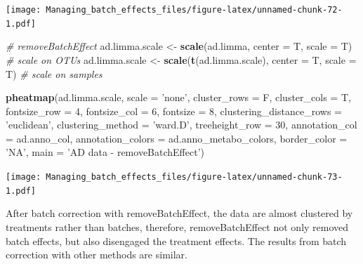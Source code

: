\documentclass[]{book}
\newenvironment{Shaded}{\begin{snugshade}}{\end{snugshade}}
\newcommand{\KeywordTok}[1]{\textcolor[rgb]{0.13,0.29,0.53}{\textbf{#1}}}
\newcommand{\DataTypeTok}[1]{\textcolor[rgb]{0.13,0.29,0.53}{#1}}
\newcommand{\DecValTok}[1]{\textcolor[rgb]{0.00,0.00,0.81}{#1}}
\newcommand{\StringTok}[1]{\textcolor[rgb]{0.31,0.60,0.02}{#1}}
\newcommand{\CommentTok}[1]{\textcolor[rgb]{0.56,0.35,0.01}{\textit{#1}}}
\newcommand{\NormalTok}[1]{#1}
\begin{document}
\texttt{[image: Managing\_batch\_effects\_files/figure-latex/unnamed-chunk-72-1.pdf]}

\begin{Shaded}
\begin{Highlighting}[]
\CommentTok{# removeBatchEffect}
\NormalTok{ad.limma.scale <-}\StringTok{ }\KeywordTok{scale}\NormalTok{(ad.limma, }\DataTypeTok{center =}\NormalTok{ T, }\DataTypeTok{scale =}\NormalTok{ T) }\CommentTok{# scale on OTUs}
\NormalTok{ad.limma.scale <-}\StringTok{ }\KeywordTok{scale}\NormalTok{(}\KeywordTok{t}\NormalTok{(ad.limma.scale), }\DataTypeTok{center =}\NormalTok{ T, }\DataTypeTok{scale =}\NormalTok{ T) }\CommentTok{# scale on samples}

\KeywordTok{pheatmap}\NormalTok{(ad.limma.scale, }
         \DataTypeTok{scale =} \StringTok{'none'}\NormalTok{, }
         \DataTypeTok{cluster_rows =}\NormalTok{ F, }
         \DataTypeTok{cluster_cols =}\NormalTok{ T, }
         \DataTypeTok{fontsize_row =} \DecValTok{4}\NormalTok{, }\DataTypeTok{fontsize_col =} \DecValTok{6}\NormalTok{,}
         \DataTypeTok{fontsize =} \DecValTok{8}\NormalTok{,}
         \DataTypeTok{clustering_distance_rows =} \StringTok{'euclidean'}\NormalTok{,}
         \DataTypeTok{clustering_method =} \StringTok{'ward.D'}\NormalTok{,}
         \DataTypeTok{treeheight_row =} \DecValTok{30}\NormalTok{,}
         \DataTypeTok{annotation_col =}\NormalTok{ ad.anno_col,}
         \DataTypeTok{annotation_colors =}\NormalTok{ ad.anno_metabo_colors,}
         \DataTypeTok{border_color =} \StringTok{'NA'}\NormalTok{,}
         \DataTypeTok{main =} \StringTok{'AD data - removeBatchEffect'}\NormalTok{)}
\end{Highlighting}
\end{Shaded}

\texttt{[image: Managing\_batch\_effects\_files/figure-latex/unnamed-chunk-73-1.pdf]}

After batch correction with removeBatchEffect, the data are almost
clustered by treatments rather than batches, therefore,
removeBatchEffect not only removed batch effects, but also disengaged
the treatment effects. The results from batch correction with other
methods are similar.
\end{document}
